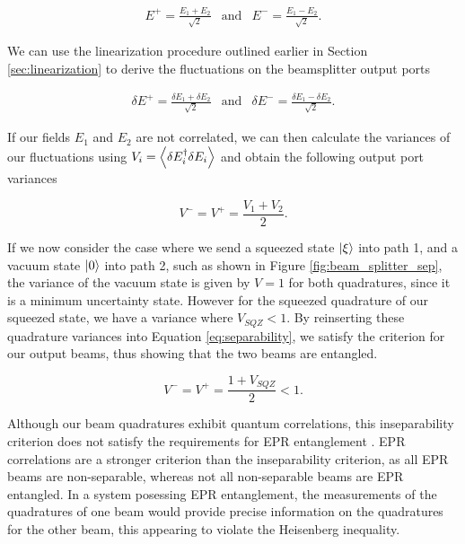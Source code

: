 \begin{eqnarray}
  \label{eq:e_beamsplitter}
  E^+ = \frac{E_1 + E_2}{\sqrt{2}}  & \mathrm{and} & E^- = \frac{E_1 - E_2}{\sqrt{2}}   .
\end{eqnarray}

\noindent
We can use the linearization procedure outlined earlier in Section \ref{sec:linearization} to derive the fluctuations on the beamsplitter output ports

\begin{eqnarray}
  \label{eq:bs_fluctuations}
  \delta E^+ = \frac{\delta E_1 + \delta E_2}{\sqrt{2}} & \mathrm{and} & \delta E^- = \frac{\delta E_1 - \delta E_2}{\sqrt{2}}  .
\end{eqnarray}

\noindent
If our fields $E_1$ and $E_2$ are not correlated, we can then calculate the variances of our fluctuations using $V_i = \left< \delta E^\dagger_i \delta E_i \right> $ and obtain the following output port variances 

\begin{equation}
  \label{eq:bs_vaiances}
  V^- = V^+ = \frac{V_1 + V_2}{2}   .
\end{equation}

\noindent
If we now consider the case where we send a squeezed state $\left| \xi \right>$ into path 1, and a vacuum state $\left| 0 \right>$ into path 2, such as shown in Figure \ref{fig:beam_splitter_sep}, the variance of the vacuum state is given by $V=1$ for both quadratures, since it is a minimum uncertainty state.  However for the squeezed quadrature of our squeezed state, we have a variance where $V_{SQZ} < 1$.  By reinserting these quadrature variances into Equation \ref{eq:separability}, we satisfy the criterion for our output beams, thus showing that the two beams are entangled.

\begin{equation}
  \label{eq:bs_insep}
  V^- = V^+ = \frac{1 + V_{SQZ}}{2}  < 1 .
\end{equation}

\noindent
Although our beam quadratures exhibit quantum correlations, this inseparability
criterion does not satisfy the requirements for EPR entanglement \cite{Reid88}
\cite{Reid89}.  EPR correlations are a stronger criterion than the
inseparability criterion, as all EPR beams are non-separable, whereas not all
non-separable beams are EPR entangled.  In a system posessing EPR entanglement, the measurements of the
quadratures of one beam would provide precise information on the quadratures
for the other beam, this appearing to violate the Heisenberg inequality.

